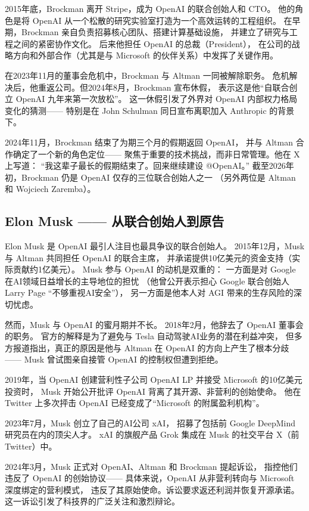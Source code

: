 2015年底，Brockman 离开 Stripe，成为 OpenAI 的联合创始人和 CTO。
他的角色是将 OpenAI 从一个松散的研究实验室打造为一个高效运转的工程组织。
在早期，Brockman 亲自负责招募核心团队、搭建计算基础设施，
并建立了研究与工程之间的紧密协作文化。
后来他担任 OpenAI 的总裁（President），
在公司的战略方向和外部合作（尤其是与 Microsoft 的伙伴关系）中发挥了关键作用。

在2023年11月的董事会危机中，Brockman 与 Altman 一同被解除职务。
危机解决后，他重返公司。但2024年8月，Brockman 宣布休假，
表示这是他``自联合创立 OpenAI 九年来第一次放松''。
这一休假引发了外界对 OpenAI 内部权力格局变化的猜测——
特别是在 John Schulman 同日宣布离职加入 Anthropic 的背景下。

2024年11月，Brockman 结束了为期三个月的假期返回 OpenAI，
并与 Altman 合作确定了一个新的角色定位——
聚焦于重要的技术挑战，而非日常管理。他在 X 上写道：
``我这辈子最长的假期结束了。回来继续建设 @OpenAI。''
截至2026年初，Brockman 仍是 OpenAI 仅存的三位联合创始人之一
（另外两位是 Altman 和 Wojciech Zaremba）。


\subsection{Elon Musk —— 从联合创始人到原告}
\label{subsec:elon-musk}

Elon Musk 是 OpenAI 最引人注目也最具争议的联合创始人。
2015年12月，Musk 与 Altman 共同担任 OpenAI 的联合主席，
并承诺提供10亿美元的资金支持（实际贡献约1亿美元）。
Musk 参与 OpenAI 的动机是双重的：
一方面是对 Google 在AI领域日益增长的主导地位的担忧
（他曾公开表示担心 Google 联合创始人 Larry Page ``不够重视AI安全''），
另一方面是他本人对 AGI 带来的生存风险的深切忧虑。

然而，Musk 与 OpenAI 的蜜月期并不长。
2018年2月，他辞去了 OpenAI 董事会的职务。
官方的解释是为了避免与 Tesla 自动驾驶AI业务的潜在利益冲突，
但多方报道指出，真正的原因是他与 Altman 在 OpenAI 的方向上产生了根本分歧——
Musk 曾试图亲自接管 OpenAI 的控制权但遭到拒绝。

2019年，当 OpenAI 创建营利性子公司 OpenAI LP 并接受 Microsoft 的10亿美元投资时，
Musk 开始公开批评 OpenAI 背离了其开源、非营利的创始使命。
他在 Twitter 上多次抨击 OpenAI 已经变成了``Microsoft 的附属盈利机构''。

2023年7月，Musk 创立了自己的AI公司 xAI，
招募了包括前 Google DeepMind 研究员在内的顶尖人才。
xAI 的旗舰产品 Grok 集成在 Musk 的社交平台 X（前 Twitter）中。

2024年3月，Musk 正式对 OpenAI、Altman 和 Brockman 提起诉讼，
指控他们违反了 OpenAI 的创始协议——
具体来说，OpenAI 从非营利转向与 Microsoft 深度绑定的营利模式，
违反了其原始使命。诉讼要求返还利润并恢复开源承诺。
这一诉讼引发了科技界的广泛关注和激烈辩论。

